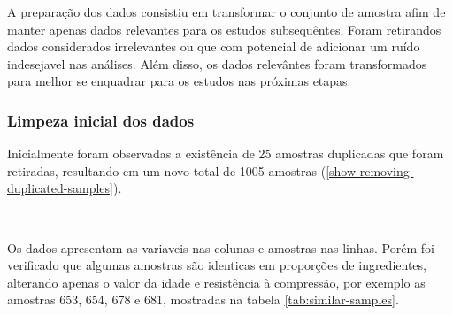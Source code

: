 \documentclass[]{article}
\begin{document}
A preparação dos dados consistiu em transformar o conjunto de amostra
afim de manter apenas dados relevantes para os estudos subsequêntes.
Foram retirandos dados considerados irrelevantes ou que com potencial de
adicionar um ruído indesejavel nas análises. Além disso, os dados
relevântes foram transformados para melhor se enquadrar para os estudos
nas próximas etapas.

\hypertarget{limpeza-inicial-dos-dados}{%
\subsubsection{Limpeza inicial dos
dados}\label{limpeza-inicial-dos-dados}}

Inicialmente foram observadas a existência de 25 amostras duplicadas que
foram retiradas, resultando em um novo total de 1005 amostras
(\ref{show-removing-duplicated-samples}).

~

Os dados apresentam as variaveis nas colunas e amostras nas linhas.
Porém foi verificado que algumas amostras são identicas em proporções de
ingredientes, alterando apenas o valor da idade e resistência à
compressão, por exemplo as amostras 653, 654, 678 e 681, mostradas na
tabela \ref{tab:similar-samples}.

~

\begin{table}[H]

\caption{\label{tab:similar-samples}Amostras com a mesma composição}
\centering
{}
\end{table}
\end{document}
